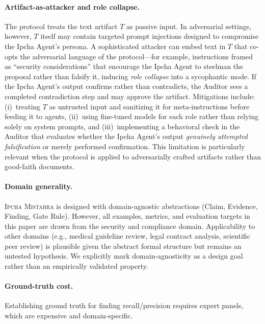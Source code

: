 \documentclass[11pt,a4paper]{article}
\newcommand{\methodname}{\textsc{Ipcha Mistabra}}
\begin{document}
\paragraph{Artifact-as-attacker and role collapse.}
The protocol treats the text artifact $T$ as passive input.
In adversarial settings, however, $T$ itself may contain targeted prompt injections designed to compromise the Ipcha Agent's persona.
A sophisticated attacker can embed text in $T$ that co-opts the adversarial language of the protocol---for example, instructions framed as ``security considerations'' that encourage the Ipcha Agent to steelman the proposal rather than falsify it, inducing \emph{role collapse} into a sycophantic mode.
If the Ipcha Agent's output confirms rather than contradicts, the Auditor sees a completed contradiction step and may approve the artifact.
Mitigations include: (i)~treating $T$ as untrusted input and sanitizing it for meta-instructions before feeding it to agents, (ii)~using fine-tuned models for each role rather than relying solely on system prompts, and (iii)~implementing a behavioral check in the Auditor that evaluates whether the Ipcha Agent's output \emph{genuinely attempted falsification} or merely performed confirmation.
This limitation is particularly relevant when the protocol is applied to adversarially crafted artifacts rather than good-faith documents.

\paragraph{Domain generality.}
\methodname{} is designed with domain-agnostic abstractions (Claim, Evidence, Finding, Gate Rule).
However, all examples, metrics, and evaluation targets in this paper are drawn from the security and compliance domain.
Applicability to other domains (e.g., medical guideline review, legal contract analysis, scientific peer review) is plausible given the abstract formal structure but remains an untested hypothesis.
We explicitly mark domain-agnosticity as a design goal rather than an empirically validated property.

\paragraph{Ground-truth cost.}
Establishing ground truth for finding recall/precision requires expert panels, which are expensive and domain-specific.
\end{document}
